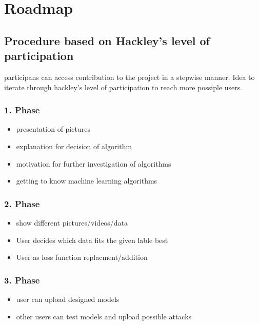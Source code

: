 \chapter{Roadmap}\label{ch:examples}

\section{Procedure based on Hackley's level of participation}

participans can access contribution to the project in a stepwise manner. 
Idea to iterate through hackley's level of participation to reach more possiple users.

\subsection{1. Phase}  

\begin{itemize}
    \item presentation of pictures
    \item explanation for decision of algorithm
    \item motivation for further investigation of algorithms
    \item getting to know machine learning algorithms
\end{itemize}

\subsection{2. Phase}

\begin{itemize}
    \item show different pictures/videos/data
    \item User decides which data fits the given lable best
    \item User as loss function replacment/addition
\end{itemize}

\subsection{3. Phase}

\begin{itemize}
    \item user can upload designed models
    \item other users can test models and upload possible attacks
\end{itemize}


